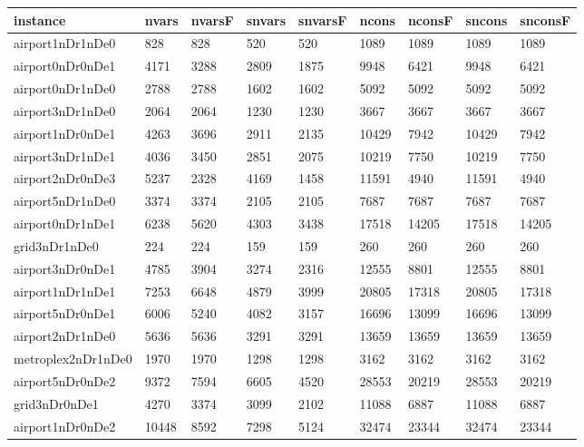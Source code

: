 \documentclass[../thesis.tex]{subfiles}
\begin{document}
\begin{table}[!ht]
    \centering
    \begin{tabular}{|l|l|l|l|l|l|l|l|l|}
    \hline
        instance & nvars & nvarsF & snvars & snvarsF & ncons & nconsF & sncons & snconsF \\ \hline
        airport1nDr1nDe0 & 828 & 828 & 520 & 520 & 1089 & 1089 & 1089 & 1089 \\ \hline
        airport0nDr0nDe1 & 4171 & 3288 & 2809 & 1875 & 9948 & 6421 & 9948 & 6421 \\ \hline
        airport0nDr1nDe0 & 2788 & 2788 & 1602 & 1602 & 5092 & 5092 & 5092 & 5092 \\ \hline
        airport3nDr1nDe0 & 2064 & 2064 & 1230 & 1230 & 3667 & 3667 & 3667 & 3667 \\ \hline
        airport1nDr0nDe1 & 4263 & 3696 & 2911 & 2135 & 10429 & 7942 & 10429 & 7942 \\ \hline
        airport3nDr1nDe1 & 4036 & 3450 & 2851 & 2075 & 10219 & 7750 & 10219 & 7750 \\ \hline
        airport2nDr0nDe3 & 5237 & 2328 & 4169 & 1458 & 11591 & 4940 & 11591 & 4940 \\ \hline
        airport5nDr1nDe0 & 3374 & 3374 & 2105 & 2105 & 7687 & 7687 & 7687 & 7687 \\ \hline
        airport0nDr1nDe1 & 6238 & 5620 & 4303 & 3438 & 17518 & 14205 & 17518 & 14205 \\ \hline
        grid3nDr1nDe0 & 224 & 224 & 159 & 159 & 260 & 260 & 260 & 260 \\ \hline
        airport3nDr0nDe1 & 4785 & 3904 & 3274 & 2316 & 12555 & 8801 & 12555 & 8801 \\ \hline
        airport1nDr1nDe1 & 7253 & 6648 & 4879 & 3999 & 20805 & 17318 & 20805 & 17318 \\ \hline
        airport5nDr0nDe1 & 6006 & 5240 & 4082 & 3157 & 16696 & 13099 & 16696 & 13099 \\ \hline
        airport2nDr1nDe0 & 5636 & 5636 & 3291 & 3291 & 13659 & 13659 & 13659 & 13659 \\ \hline
        metroplex2nDr1nDe0 & 1970 & 1970 & 1298 & 1298 & 3162 & 3162 & 3162 & 3162 \\ \hline
        airport5nDr0nDe2 & 9372 & 7594 & 6605 & 4520 & 28553 & 20219 & 28553 & 20219 \\ \hline
        grid3nDr0nDe1 & 4270 & 3374 & 3099 & 2102 & 11088 & 6887 & 11088 & 6887 \\ \hline
        airport1nDr0nDe2 & 10448 & 8592 & 7298 & 5124 & 32474 & 23344 & 32474 & 23344 \\ \hline

\end{tabular}
\end{table}
\end{document}

